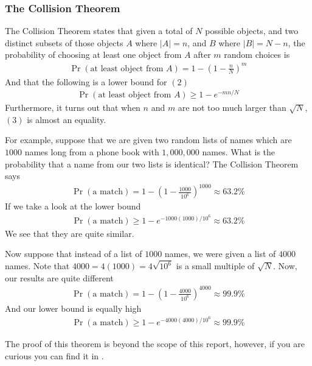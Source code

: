 \documentclass[12pt, a4paper, final]{report}
\begin{document}
\subsubsection{The Collision Theorem}

The Collision Theorem states that given a total of $N$ possible objects,
and two distinct subsets of those objects $A$ where $|A| = n$, and $B$ where
$|B| = N - n$, the probability of choosing at least one object from $A$ after
$m$ random choices is
\begin{align}
    \Pr\left(\text{at least object from $A$}\right) = 1 - \left(1 - \frac{n}{N}\right)^m
\end{align}
And that the following is a lower bound for $(2)$
\begin{align}
    \Pr\left(\text{at least object from $A$}\right) \geq 1 - e^{-mn/N}
\end{align}
Furthermore, it turns out that when $n$ and $m$ are not too much larger than
$\sqrt{N}$, $(3)$ is almost an equality.

For example, suppose that we are given two random lists of names which are $1000$
names long from a phone book with $1,000,000$ names. What is the probability
that a name from our two lists is identical? The Collision Theorem says
\begin{align*}
    \Pr\left(\text{a match}\right) = 1 - \left(1 - \frac{1000}{10^6}\right)^{1000} \approx 63.2 \%
\end{align*}
If we take a look at the lower bound
\begin{align*}
    \Pr\left(\text{a match}\right) \geq 1 - e^{-1000(1000)/10^6} \approx 63.2 \%
\end{align*}
We see that they are quite similar.

Now suppose that instead of a list of $1000$ names, we were given a list of $4000$
names. Note that $4000 = 4(1000) = 4\sqrt{10^6}$ is a small multiple of $\sqrt{N}$. Now, our
results are quite different
\begin{align*}
    \Pr\left(\text{a match}\right) = 1 - \left(1 - \frac{4000}{10^6}\right)^{4000} \approx 99.9 \%
\end{align*}
And our lower bound is equally high
\begin{align*}
    \Pr\left(\text{a match}\right) \geq 1 - e^{-4000(4000)/10^6} \approx 99.9 \%
\end{align*}

The proof of this theorem is beyond the scope of this report, however, if you
are curious you can find it in \cite[p.~227]{silverman}.
\end{document}
